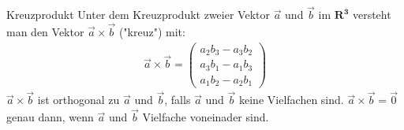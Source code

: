 \documentclass{article}
\begin{document}
\begin{boxx}[Red]{Kreuzprodukt}
    Unter dem Kreuzprodukt zweier Vektor $\vec{a}$ und $\vec{b}$ im $\mathbf{R^3}$
    versteht man den Vektor $\vec{a} \times \vec{b}$ ("kreuz") mit:
    \begin{align*}
        \vec{a} \times \vec{b} = \begin{pmatrix}
            a_2b_3 - a_3b_2 \\
            a_3b_1 - a_1b_3 \\
            a_1b_2 - a_2b_1
        \end{pmatrix}
    \end{align*}
    $\vec{a} \times \vec{b}$ ist orthogonal zu $\vec{a}$ und $\vec{b}$, 
    falls $\vec{a}$ und $\vec{b}$ keine Vielfachen sind.
    $\vec{a} \times \vec{b} = \vec{0}$ genau dann, wenn $\vec{a}$ und $\vec{b}$ Vielfache voneinader sind.
\end{boxx}
\end{document}
